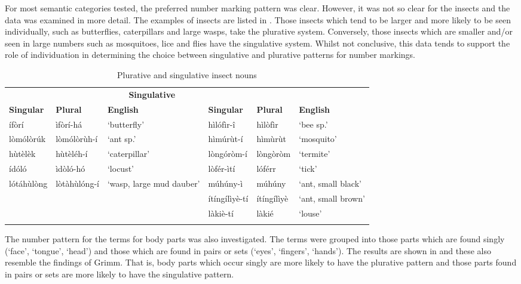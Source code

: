 \documentclass[output=paper]{langsci/langscibook}
\begin{document}
For most semantic categories tested, the preferred number marking pattern was clear. However, it was not so clear for the insects and the data was examined in more detail. The examples of insects are listed in . Those insects which tend to be larger and more likely to be seen individually, such as butterflies, caterpillars and large wasps, take the plurative system. Conversely, those insects which are smaller and/or seen in large numbers such as mosquitoes, lice and flies have the singulative system. Whilst not conclusive, this data tends to support the role of individuation in determining the choice between singulative and plurative patterns for number markings.

\begin{table}
\begin{tabularx}{\textwidth}{llXllX}
\lsptoprule

\multicolumn{3}{c}{\textbf{Plurative}} & \multicolumn{3}{c}{\textbf{Singulative}}\\ \cmidrule(lr){1-3}\cmidrule(lr){4-6}
 \textbf{Singular} & \textbf{Plural} & \textbf{English} & \textbf{Singular} & \textbf{Plural} & \textbf{English}\\ \midrule
 \'{i}f\`{o}r\'{i} &  \`{i}f\`{o}r\'{i}-h\'{a} & ‘butterfly’ &  h\`{i}l\'{o}f\`{i}r-\^{i} &  h\`{i}l\`{o}f\`{i}r & ‘bee sp.’\\
 l\`{o}m\'{o}l\`{o}r\'{u}k &  l\`{o}m\'{o}l\`{o}r\`{u}h-\'{i} & ‘ant sp.’ &  h\`{i}m\'{u}r\`{u}t-\'{i} &  h\`{i}m\`{u}r\`{u}t & ‘mosquito’\\
 h\`{u}t\`{e}l\`{e}k &  h\`{u}t\`{e}l\'{e}h-\'{i} & ‘caterpillar’ &  l\`{o}ng\'{o}r\`{o}m-\'{i} &  l\`{o}ng\`{o}r\`{o}m & ‘termite’\\
 \'{i}d\'{o}l\'{o} &  \`{i}d\`{o}l\'{o}-h\'{o} & ‘locust’ &  l\`{o}f\'{e}r-\`{i}t\'{i} &  l\'{o}f\'{e}rr & ‘tick’\\
 l\'{o}t\'{a}h\`{u}l\`{o}ng &  l\`{o}t\`{a}h\`{u}l\'{o}ng-\'{i} & ‘wasp, large mud dauber’ &  m\'{u}h\'{u}ny-\`{i} &  m\'{u}h\'{u}ny & ‘ant, small black’\\
&  &  &  \'{i}t\'{i}ng\'{i}l\`{i}y\`{e}-t\'{i} &  \'{i}t\'{i}ng\'{i}l\`{i}y\`{e} & ‘ant, small brown’\\
&  &  &  l\`{a}ki\`{e}-t\'{i} &  l\`{a}ki\'{e} & ‘louse’\\
\lspbottomrule
\end{tabularx}
\caption{Plurative and singulative insect nouns}
\label{tab:moodie:7}
\end{table}

The number pattern for the terms for body parts was also investigated. The terms were grouped into those parts which are found singly (‘face’, ‘tongue’, ‘head’) and those which are found in pairs or sets (‘eyes’, ‘fingers’, ‘hands’). The results are shown in  and these also resemble the findings of Grimm.  That is, body parts which occur singly are more likely to have the plurative pattern and those parts found in pairs or sets are more likely to have the singulative pattern. 
\end{document}
